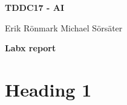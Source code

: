 \documentclass[12pt,a4paper]{article}
\begin{document}
\begin{center}
    \Huge
    \textbf{TDDC17 - AI}

    \vspace{0.3cm}
    \Large
    Erik Rönmark
    Michael Sörsäter
    
    \vspace{0.7cm}
    \textbf{Labx report}
\end{center}

\section{Heading 1}

\lipsum[1-2]
\end{document}
